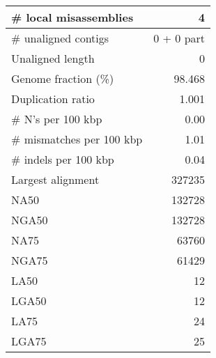 \documentclass[12pt,a4paper]{article}
\begin{document}
\begin{table}[ht]
\begin{center}
\begin{tabular}{|l*{1}{|r}|}
\# local misassemblies & 4 \\ \hline
\# unaligned contigs & 0 + 0 part \\ \hline
Unaligned length & 0 \\ \hline
Genome fraction (\%) & 98.468 \\ \hline
Duplication ratio & 1.001 \\ \hline
\# N's per 100 kbp & 0.00 \\ \hline
\# mismatches per 100 kbp & 1.01 \\ \hline
\# indels per 100 kbp & 0.04 \\ \hline
Largest alignment & 327235 \\ \hline
NA50 & 132728 \\ \hline
NGA50 & 132728 \\ \hline
NA75 & 63760 \\ \hline
NGA75 & 61429 \\ \hline
LA50 & 12 \\ \hline
LGA50 & 12 \\ \hline
LA75 & 24 \\ \hline
LGA75 & 25 \\ \hline
\end{tabular}
\end{center}
\end{table}
\end{document}
